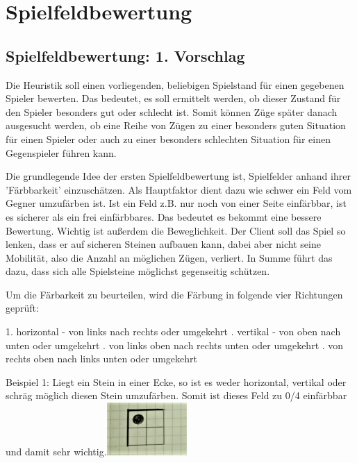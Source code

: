 \documentclass[12pt,a4paper,bibliography=totocnumbered,listof=totocnumbered]{scrartcl}
\begin{document}
\section{Spielfeldbewertung}
\subsection{Spielfeldbewertung: 1. Vorschlag}
Die Heuristik soll einen vorliegenden, beliebigen Spielstand für einen gegebenen Spieler bewerten. Das bedeutet, es soll ermittelt werden, ob dieser Zustand für den Spieler besonders gut oder schlecht ist. Somit können Züge später danach ausgesucht werden, ob eine Reihe von Zügen zu einer besonders guten Situation für einen Spieler oder auch zu einer besonders schlechten Situation für einen Gegenspieler führen kann.  

Die grundlegende Idee der ersten Spielfeldbewertung ist, Spielfelder anhand ihrer 'Färbbarkeit' einzuschätzen. Als Hauptfaktor dient dazu wie schwer ein Feld vom Gegner umzufärben ist. Ist ein Feld z.B. nur noch von einer Seite einfärbbar, ist es sicherer als ein frei einfärbbares. Das bedeutet es bekommt eine bessere Bewertung. Wichtig ist außerdem die Beweglichkeit. Der Client soll das Spiel so lenken, dass er auf sicheren Steinen aufbauen kann, dabei aber nicht seine Mobilität, also die Anzahl an möglichen Zügen, verliert. In Summe führt das dazu, dass sich alle Spielsteine möglichst gegenseitig schützen.


Um die Färbarkeit zu beurteilen, wird die Färbung in folgende vier Richtungen geprüft:

1. horizontal - von links nach rechts oder umgekehrt . vertikal - von oben nach unten oder umgekehrt . von links oben nach rechts unten oder umgekehrt . von rechts oben nach links unten oder umgekehrt \newline
	
Beispiel 1: Liegt ein Stein in einer Ecke, so ist es weder horizontal, vertikal oder schräg möglich diesen Stein umzufärben. Somit ist dieses Feld zu 0/4 einfärbbar und damit sehr wichtig.\newline \includegraphics[height=2cm]{pics/beispiel1}
\end{document}

